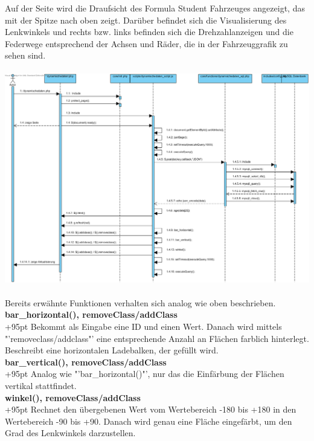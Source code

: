 \documentclass[fontsize = 12pt, paper = a4]{scrreprt}
\begin{document}
Auf der Seite wird die Draufsicht des Formula Student Fahrzeuges angezeigt, das mit der Spitze nach oben zeigt. Darüber befindet sich die Visualisierung des Lenkwinkels und rechts bzw. links befinden sich die Drehzahlanzeigen und die Federwege entsprechend der Achsen und Räder, die in der Fahrzeuggrafik zu sehen sind.
\\ \\
\includegraphics[scale=0.485]{dynamischedaten.png}
\\ \\
Bereits erwähnte Funktionen verhalten sich analog wie oben beschrieben.\\


\textbf{bar\_horizontal(), removeClass/addClass}\\
\hangindent+95pt  
Bekommt als Eingabe eine ID und einen Wert. Danach wird mittels "'removeclass/addclass"' eine entsprechende Anzahl an Flächen farblich hinterlegt. Beschreibt eine horizontalen Ladebalken, der gefüllt wird.\\


\textbf{bar\_vertical(), removeClass/addClass}\\
\hangindent+95pt  
Analog wie "'bar\_horizontal()"', nur das die Einfärbung der Flächen vertikal stattfindet.\\ 


\textbf{winkel(), removeClass/addClass}\\
\hangindent+95pt 
Rechnet den übergebenen Wert vom Wertebereich -180 bis +180 in den Wertebereich -90 bis +90. Danach wird genau eine Fläche eingefärbt, um den Grad des Lenkwinkels darzustellen.

\newpage
\end{document}
